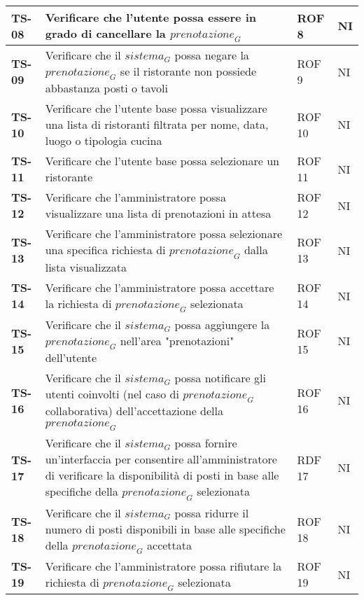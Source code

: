 \begin{longtable}{|>{\centering\arraybackslash}p{1.5cm}|p{12cm}|p{2cm}|p{1cm}|}
  \hline
  \rowcolor{gray!10}
  \textbf{TS-08} & Verificare che l'utente possa essere in grado di cancellare la $\textit{prenotazione}_G$ & ROF 8 & NI \\ 
  \hline
  \rowcolor{gray!10}
  \textbf{TS-09} & Verificare che il $\textit{sistema}_G$ possa negare la $\textit{prenotazione}_G$ se il ristorante non possiede abbastanza posti o tavoli & ROF 9 & NI \\ 
  \hline
  \rowcolor{gray!10}
  \textbf{TS-10} & Verificare che l'utente base possa visualizzare una lista di ristoranti filtrata per nome, data, luogo o tipologia cucina & ROF 10 & NI \\ 
  \hline
  \rowcolor{gray!10}
  \textbf{TS-11} & Verificare che l'utente base possa selezionare un ristorante & ROF 11 & NI \\ 
  \hline
  \rowcolor{gray!10}
  \textbf{TS-12} & Verificare che l'amministratore possa visualizzare una lista di prenotazioni in attesa & ROF 12 & NI \\
  \hline
  \rowcolor{gray!10}
  \textbf{TS-13} & Verificare che l'amministratore possa selezionare una specifica richiesta di $\textit{prenotazione}_G$ dalla lista visualizzata & ROF 13 & NI \\ 
  \hline
  \rowcolor{gray!10}
  \textbf{TS-14} & Verificare che l'amministratore possa accettare la richiesta di $\textit{prenotazione}_G$ selezionata & ROF 14 & NI \\ 
  \hline
  \rowcolor{gray!10}
  \textbf{TS-15} & Verificare che il $\textit{sistema}_G$ possa aggiungere la $\textit{prenotazione}_G$ nell'area "prenotazioni" dell'utente & ROF 15 & NI \\
  \hline
  \rowcolor{gray!10}
  \textbf{TS-16} & Verificare che il $\textit{sistema}_G$ possa notificare gli utenti coinvolti (nel caso di $\textit{prenotazione}_G$ collaborativa) dell'accettazione della $\textit{prenotazione}_G$ & ROF 16 & NI \\ 
  \hline
  \rowcolor{gray!10}
  \textbf{TS-17} & Verificare che il $\textit{sistema}_G$ possa fornire un'interfaccia per consentire all'amministratore di verificare la disponibilità di posti in base alle specifiche della $\textit{prenotazione}_G$ selezionata & RDF 17 & NI \\ 
  \hline
  \rowcolor{gray!10}
  \textbf{TS-18} & Verificare che il $\textit{sistema}_G$ possa ridurre il numero di posti disponibili in base alle specifiche della $\textit{prenotazione}_G$ accettata & ROF 18 & NI \\ 
  \hline
  \rowcolor{gray!10}
  \textbf{TS-19} & Verificare che l'amministratore possa rifiutare la richiesta di $\textit{prenotazione}_G$ selezionata & ROF 19 & NI \\ 

\end{longtable}
